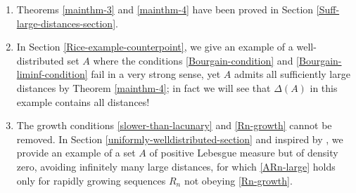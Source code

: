 \documentclass[a4paper,11pt]{amsart}
\numberwithin{equation}{section}
\begin{document}
\begin{enumerate}[1.]
\item Theorems \ref{mainthm-3} and \ref{mainthm-4} have been proved in Section \ref{Suff-large-distances-section}. 
\vskip0.1in
\item In Section \ref{Rice-example-counterpoint}, we give an example of a well-distributed set $A$ where the conditions \eqref{Bourgain-condition} and \eqref{Bourgain-liminf-condition} fail in a very strong sense, yet $A$ admits all sufficiently large distances by Theorem \ref{mainthm-4}; in fact we will see that $\Delta(A)$ in this example contains all distances!   
\vskip0.1in
\item The growth conditions \eqref{slower-than-lacunary} and \eqref{Rn-growth} cannot be removed. In Section \ref{uniformly-welldistributed-section} and inspired by \cite{2020Rice}, we provide an example of a set $A$ of positive Lebesgue measure but of density zero, avoiding infinitely many large distances, for which \eqref{ARn-large} holds only for rapidly growing sequences $R_n$ not obeying \eqref{Rn-growth}.  
\end{enumerate} 
\end{document}
